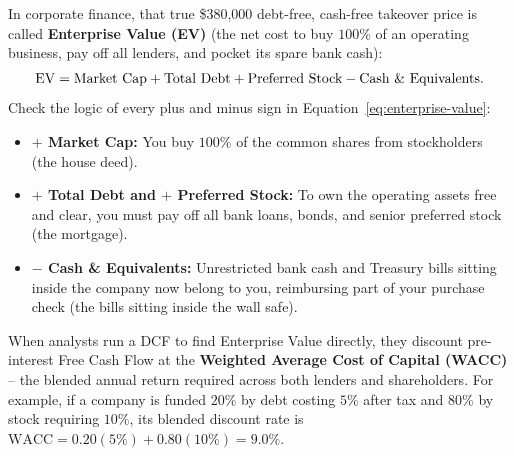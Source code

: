 In corporate finance, that true \$380,000 debt-free, cash-free takeover price is called \textbf{Enterprise Value (EV)} (the net cost to buy $100\%$ of an operating business, pay off all lenders, and pocket its spare bank cash):
\begin{equation}
 \operatorname{EV} = \text{Market Cap} + \text{Total Debt} + \text{Preferred Stock} - \text{Cash \& Equivalents}.
 \label{eq:enterprise-value}
\end{equation}
Check the logic of every plus and minus sign in Equation~\eqref{eq:enterprise-value}:
\begin{itemize}
 \item \textbf{$+$ Market Cap:} You buy $100\%$ of the common shares from stockholders (the house deed).
 \item \textbf{$+$ Total Debt and $+$ Preferred Stock:} To own the operating assets free and clear, you must pay off all bank loans, bonds, and senior preferred stock (the mortgage).
 \item \textbf{$-$ Cash \& Equivalents:} Unrestricted bank cash and Treasury bills sitting inside the company now belong to you, reimbursing part of your purchase check (the bills sitting inside the wall safe).
\end{itemize}

When analysts run a DCF to find Enterprise Value directly, they discount pre-interest Free Cash Flow at the \textbf{Weighted Average Cost of Capital (WACC)} -- the blended annual return required across both lenders and shareholders. For example, if a company is funded $20\%$ by debt costing $5\%$ after tax and $80\%$ by stock requiring $10\%$, its blended discount rate is $\text{WACC} = 0.20(5\%) + 0.80(10\%) = 9.0\%$.

